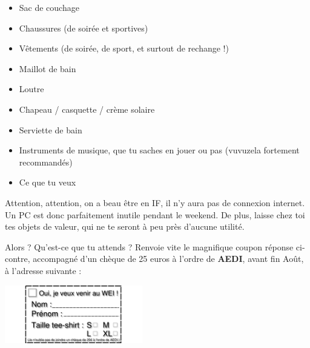 \begin{itemize}
\item Sac de couchage
\item Chaussures (de soirée et sportives)
\item Vêtements (de soirée, de sport, et surtout de rechange !)
\item Maillot de bain
\item Loutre
\item Chapeau / casquette / crème solaire
\item Serviette de bain
\item Instruments de musique, que tu saches en jouer ou pas (vuvuzela fortement recommandés)
\item Ce que tu veux
\end{itemize}

\vspace{1em}

Attention, attention, on a beau être en IF, il n'y aura pas de connexion
internet. Un PC est donc parfaitement inutile pendant le weekend. De plus,
laisse chez toi tes objets de valeur, qui ne te seront à peu près d'aucune
utilité.

\vspace{1em}

Alors ? Qu'est-ce que tu attends ? Renvoie vite le magnifique coupon réponse ci-contre, 
accompagné d'un chèque de 25 euros à l'ordre de \textbf{AEDI}, avant fin Août,
à l'adresse suivante :

\adresseCoupon
\begin{center}
\includegraphics[angle=90, width=6cm]{images/coupon.png}
\end{center}
